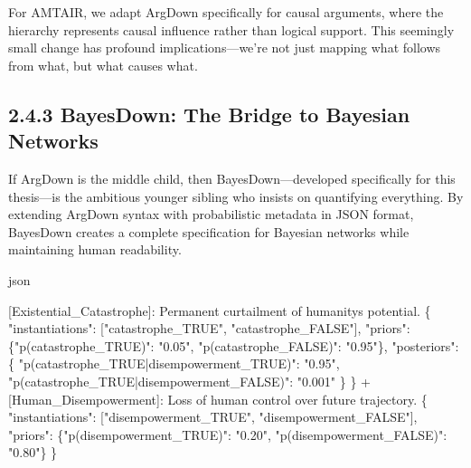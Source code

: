 \documentclass[
  11pt,
  letterpaper,
]{book}
\newenvironment{Shaded}{\begin{snugshade}}{\end{snugshade}}
\newcommand{\DataTypeTok}[1]{\textcolor[rgb]{0.68,0.00,0.00}{#1}}
\newcommand{\ErrorTok}[1]{\textcolor[rgb]{0.68,0.00,0.00}{#1}}
\newcommand{\FunctionTok}[1]{\textcolor[rgb]{0.28,0.35,0.67}{#1}}
\newcommand{\OtherTok}[1]{\textcolor[rgb]{0.00,0.23,0.31}{#1}}
\newcommand{\StringTok}[1]{\textcolor[rgb]{0.13,0.47,0.30}{#1}}
\begin{document}
For AMTAIR, we adapt ArgDown specifically for causal arguments, where
the hierarchy represents causal influence rather than logical support.
This seemingly small change has profound implications---we're not just
mapping what follows from what, but what causes what.

\subsection{2.4.3 BayesDown: The Bridge to Bayesian
Networks}\label{sec-bayesdown}

If ArgDown is the middle child, then BayesDown---developed specifically
for this thesis---is the ambitious younger sibling who insists on
quantifying everything. By extending ArgDown syntax with probabilistic
metadata in JSON format, BayesDown creates a complete specification for
Bayesian networks while maintaining human readability.

json

\begin{Shaded}
\begin{Highlighting}[]
\OtherTok{[}\ErrorTok{Existential\_Catastrophe}\OtherTok{]}\ErrorTok{:} \ErrorTok{Permanent} \ErrorTok{curtailment} \ErrorTok{of} \ErrorTok{humanity\textquotesingle{}s} \ErrorTok{potential.} \FunctionTok{\{}
  \DataTypeTok{"instantiations"}\FunctionTok{:} \OtherTok{[}\StringTok{"catastrophe\_TRUE"}\OtherTok{,} \StringTok{"catastrophe\_FALSE"}\OtherTok{]}\FunctionTok{,}
  \DataTypeTok{"priors"}\FunctionTok{:} \FunctionTok{\{}\DataTypeTok{"p(catastrophe\_TRUE)"}\FunctionTok{:} \StringTok{"0.05"}\FunctionTok{,} \DataTypeTok{"p(catastrophe\_FALSE)"}\FunctionTok{:} \StringTok{"0.95"}\FunctionTok{\},}
  \DataTypeTok{"posteriors"}\FunctionTok{:} \FunctionTok{\{}
    \DataTypeTok{"p(catastrophe\_TRUE|disempowerment\_TRUE)"}\FunctionTok{:} \StringTok{"0.95"}\FunctionTok{,}
    \DataTypeTok{"p(catastrophe\_TRUE|disempowerment\_FALSE)"}\FunctionTok{:} \StringTok{"0.001"}
  \FunctionTok{\}}
\FunctionTok{\}}
 \ErrorTok{+} \OtherTok{[}\ErrorTok{Human\_Disempowerment}\OtherTok{]}\ErrorTok{:} \ErrorTok{Loss} \ErrorTok{of} \ErrorTok{human} \ErrorTok{control} \ErrorTok{over} \ErrorTok{future} \ErrorTok{trajectory.} \FunctionTok{\{}
   \DataTypeTok{"instantiations"}\FunctionTok{:} \OtherTok{[}\StringTok{"disempowerment\_TRUE"}\OtherTok{,} \StringTok{"disempowerment\_FALSE"}\OtherTok{]}\FunctionTok{,}
   \DataTypeTok{"priors"}\FunctionTok{:} \FunctionTok{\{}\DataTypeTok{"p(disempowerment\_TRUE)"}\FunctionTok{:} \StringTok{"0.20"}\FunctionTok{,} \DataTypeTok{"p(disempowerment\_FALSE)"}\FunctionTok{:} \StringTok{"0.80"}\FunctionTok{\}}
 \FunctionTok{\}}
\end{Highlighting}
\end{Shaded}
\end{document}
